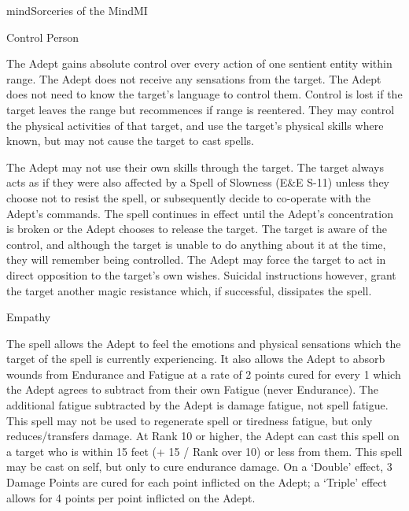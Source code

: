 \begin{College}[1.6]{mind}{Sorceries of the Mind}{MI}
\begin{spell}[G-2]{Control Person}

\begin{effects}
The Adept gains absolute control over every action of one sentient
entity within range.  The Adept does not receive any sensations from
the target.  The Adept does not need to know the target’s language to
control them. Control is lost if the target leaves the range but
recommences if range is reentered.  They may control the physical
activities of that target, and use the target’s physical skills where
known, but may not cause the target to cast spells.

The Adept may not use their own skills through the target.  The target
always acts as if they were also affected by a Spell of Slowness (E\&E
S-11) unless they choose not to resist the spell, or subsequently
decide to co-operate with the Adept’s commands.  The spell continues
in effect until the Adept’s concentration is broken or the Adept
chooses to release the target.  The target is aware of the control,
and although the target is unable to do anything about it at the time,
they will remember being controlled. The Adept may force the target to
act in direct opposition to the target’s own wishes. Suicidal
instructions however, grant the target another magic resistance which,
if successful, dissipates the spell.
\end{effects}
\end{spell}

\begin{spell}[G-3]{Empathy}

\begin{effects}
The spell allows the Adept to feel the emotions and physical
sensations which the target of the spell is currently experiencing. It
also allows the Adept to absorb wounds from Endurance and Fatigue at a
rate of 2 points cured for every 1 which the Adept agrees to subtract
from their own Fatigue (never Endurance).  The additional fatigue
subtracted by the Adept is damage fatigue, not spell fatigue. This
spell may not be used to regenerate spell or tiredness fatigue, but
only reduces/transfers damage. At Rank 10 or higher, the Adept can
cast this spell on a target who is within 15 feet (+ 15 / Rank over
10) or less from them.  This spell may be cast on self, but only to
cure endurance damage.  On a ‘Double’ effect, 3 Damage Points are
cured for each point inflicted on the Adept; a ‘Triple’ effect allows
for 4 points per point inflicted on the Adept.
\end{effects}
\end{spell}


\end{College}
